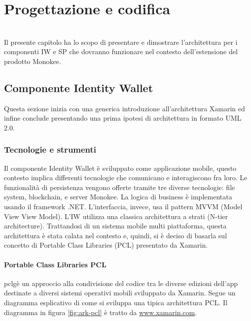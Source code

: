 
\chapter{Progettazione e codifica}
\label{cap:progettazione-codifica}

\\
Il presente capitolo ha lo scopo di presentare e dimostrare l'architettura per i componenti IW e SP che dovranno funzionare nel contesto dell'estensione del prodotto Monokee.
\section{Componente Identity Wallet}
Questa sezione inizia con una generica introduzione all’architettura Xamarin ed infine conclude presentando una prima ipotesi di architettura in formato UML 2.0.
\subsection{Tecnologie e strumenti}
\label{sec:tecnologie-strumenti}
Il componente Identity Wallet è sviluppato come applicazione mobile, questo contesto implica differenti tecnologie che comunicano e interagiscono fra loro. Le funzionalità di persistenza vengono offerte tramite tre diverse tecnologie: file system, blockchain, e server Monokee. La logica di business è implementata usando il framework .NET. L’interfaccia, invece, usa il pattern MVVM (Model View View Model).
L’IW utilizza una classica architettura a strati (N-tier architecture). Trattandosi di un sistema mobile multi piattaforma, questa architettura è stata calata nel contesto e, quindi, si è deciso di basarla sul concetto di Portable Class Libraries (PCL) presentato da Xamarin. 

\subsubsection{Portable Class Libraries PCL}
\gls{pclg}\glsfirstoccur è un approccio alla condivisione del codice tra le diverse edizioni dell’app destinate a diversi sistemi operativi mobili sviluppato da Xamarin. Segue un diagramma esplicativo di come si sviluppa una tipica architettura PCL. Il diagramma in figura \ref{fig:ark-pcl} è tratto da \url{www.xamarin.com}.

